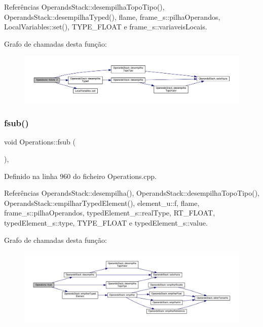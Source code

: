 Referências Operands\+Stack\+::desempilha\+Topo\+Tipo(), Operands\+Stack\+::desempilha\+Typed(), flame, frame\+\_\+s\+::pilha\+Operandos, Local\+Variables\+::set(), T\+Y\+P\+E\+\_\+\+F\+L\+O\+AT e frame\+\_\+s\+::variaveis\+Locais.

Grafo de chamadas desta função\+:
\nopagebreak
\begin{figure}[H]
\begin{center}
\leavevmode
\includegraphics[width=350pt]{classOperations_a00786621697e0e6e6c084c3cee1599ae_cgraph}
\end{center}
\end{figure}
\mbox{\label{classOperations_a138cd74b7244e430085eb4850de2b481}} 
\subsubsection{\texorpdfstring{fsub()}{fsub()}}
{\footnotesize\ttfamily void Operations\+::fsub (\begin{DoxyParamCaption}{ }\end{DoxyParamCaption})\hspace{0.3cm}{\ttfamily [static]}, {\ttfamily [private]}}



Definido na linha 960 do ficheiro Operations.\+cpp.



Referências Operands\+Stack\+::desempilha(), Operands\+Stack\+::desempilha\+Topo\+Tipo(), Operands\+Stack\+::empilhar\+Typed\+Element(), element\+\_\+u\+::f, flame, frame\+\_\+s\+::pilha\+Operandos, typed\+Element\+\_\+s\+::real\+Type, R\+T\+\_\+\+F\+L\+O\+AT, typed\+Element\+\_\+s\+::type, T\+Y\+P\+E\+\_\+\+F\+L\+O\+AT e typed\+Element\+\_\+s\+::value.

Grafo de chamadas desta função\+:
\nopagebreak
\begin{figure}[H]
\begin{center}
\leavevmode
\includegraphics[width=350pt]{classOperations_a138cd74b7244e430085eb4850de2b481_cgraph}
\end{center}
\end{figure}
\mbox{\label{classOperations_a7594e147407e1f4ede57229899fd17d6}} 
